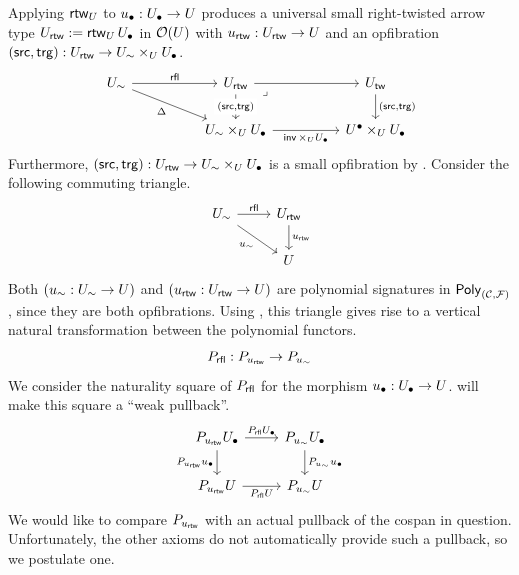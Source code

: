 Applying $\rtw[\U]$ to $\ulow : \Ulow \to \U$
produces a universal small right-twisted arrow type
$\Urtw := \rtw[\U]{\Ulow}$ in $\opfibcart(\U)$
with $\urtw : \Urtw \to \U$
and an opfibration $(\src,\trg) : \Urtw \to \Usim \times_\U \Ulow$.
  \[ \begin{tikzcd}[column sep=huge]
    	\Usim & \Urtw & \Utw \\
      & {\Usim \times_\U \Ulow} & {\Uupp \times_\U \Ulow}
      \arrow["\rfl", from=1-1, to=1-2]
      \arrow["\Delta"', from=1-1, to=2-2]
      \arrow[from=1-2, to=1-3]
      \arrow["{{(\src,\trg)}}"{description}, from=1-2, to=2-2]
      \arrow["\lrcorner"{anchor=center, pos=0.125}, draw=none, from=1-2, to=2-3]
      \arrow["{{(\src,\trg)}}", from=1-3, to=2-3]
      \arrow["{{\inv \times_\U \Ulow}}"', from=2-2, to=2-3]
    \end{tikzcd} \]
Furthermore, $(\src,\trg) : \Urtw \to \Usim \times_\U \Ulow$
is a small opfibration by .
Consider the following commuting triangle.
\[ \begin{tikzcd}
	\Usim & \Urtw \\
	& \U
	\arrow["\rfl", from=1-1, to=1-2]
	\arrow["{\usim}"', from=1-1, to=2-2]
	\arrow["\urtw", from=1-2, to=2-2]
\end{tikzcd} \]
Both $(\usim : \Usim \to \U)$ and $(\urtw : \Urtw \to \U)$ are
polynomial signatures in $\Poly_{(\CC,\FF)}$,
since they are both opfibrations.
Using ,
this triangle gives rise to a vertical natural transformation
between the polynomial functors.
\[P_{\rfl} : P_{\urtw} \to P_{\usim}\]
We consider the naturality square of $P_{\rfl}$
for the morphism $\ulow : \Ulow \to \U$.
will make this square a ``weak pullback''.
\[ \begin{tikzcd}
	{ P_{\urtw} \Ulow} & {P_{\usim} \Ulow} \\
	{ P_{\urtw} \U} & {P_{\usim} \U}
	\arrow["{{P_{\rfl} \Ulow}}", from=1-1, to=1-2]
	\arrow["{{ P_{\urtw} \ulow}}"', from=1-1, to=2-1]
	\arrow["{{P_{\usim} \ulow}}", from=1-2, to=2-2]
	\arrow["{{P_{\rfl} \U}}"', from=2-1, to=2-2]
\end{tikzcd} \]
We would like to compare $P_{\urtw}$ with an actual pullback
of the cospan in question.
Unfortunately, the other axioms do not automatically provide
such a pullback, so we postulate one.

